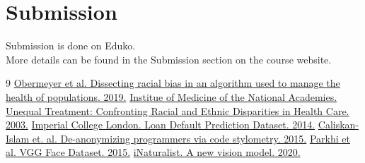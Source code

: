 \documentclass{article}
\theoremstyle{case}
\theoremstyle{definition}
\begin{document}
\section*{Submission}
Submission is done on Eduko. \\

More details can be found in the Submission section on the course website.


\newpage

\begin{thebibliography}{9}
\href{https://doi.org/10.1126/science.aax2342}{Obermeyer et al. Dissecting racial bias in an algorithm used to manage the health of populations. 2019.}
\href{https://www.nap.edu/catalog/10260/unequal-treatment-confronting-racial-and-ethnic-disparities-in-health-care}{Institue of Medicine of the National Academies. Unequal Treatment: Confronting Racial and Ethnic Disparities in Health Care. 2003.}
\href{https://www.kaggle.com/c/loan-default-prediction/data}{Imperial College London. Loan Default Prediction Dataset. 2014.}
\href{https://dl.acm.org/doi/10.5555/2831143.2831160}{Caliskan-Islam et. al. De-anonymizing programmers via code stylometry. 2015.}
\href{https://www.robots.ox.ac.uk/~vgg/data/vgg_face/}{Parkhi et al. VGG Face Dataset. 2015.}
\href{https://www.inaturalist.org/blog/31806-a-new-vision-model}{iNaturalist. A new vision model. 2020.}
\end{thebibliography}
\end{document}
